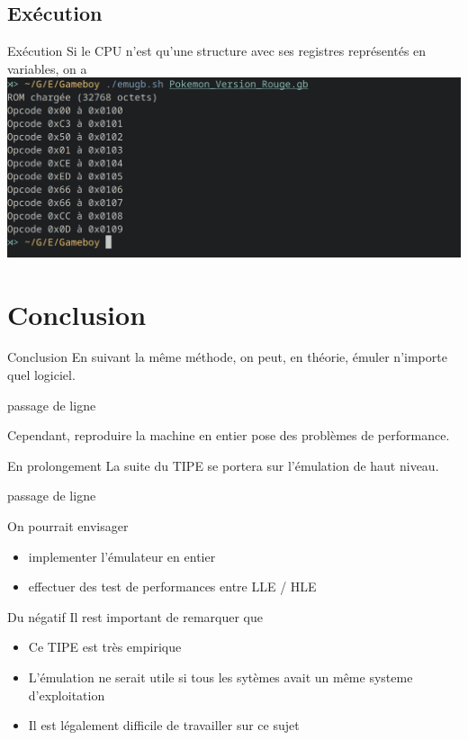 \documentclass{beamer}
\begin{document}
    \subsection{Exécution}
    \begin{frame}{Exécution}
        Si le CPU n'est qu'une structure avec ses registres représentés en variables, on a
        \includegraphics[width=1\textwidth]{images/execution.png}
    \end{frame}

    \section{Conclusion}
    \begin{frame}{Conclusion}
        En suivant la même méthode, on peut, en théorie, émuler n'importe quel logiciel.

        {\color{white} passage de ligne}

        Cependant, reproduire la machine en entier pose des problèmes de performance.
    \end{frame}

    \begin{frame}{En prolongement}
        La suite du TIPE se portera sur l'émulation de haut niveau.

        {\color{white} passage de ligne}

        On pourrait envisager
        \begin{itemize}
            \item implementer l'émulateur en entier
            \item effectuer des test de performances entre LLE / HLE
        \end{itemize}
    \end{frame}

    \begin{frame}{Du négatif}
        Il rest important de remarquer que
        \begin{itemize}
            \item Ce TIPE est très empirique
            \item L'émulation ne serait utile si tous les sytèmes avait un même systeme d'exploitation
            \item Il est légalement difficile de travailler sur ce sujet
        \end{itemize}
    \end{frame}
\end{document}
